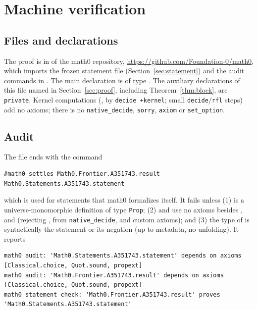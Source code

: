 \documentclass[11pt]{amsart}
\theoremstyle{plain}
\theoremstyle{definition}
\begin{document}
\section{Machine verification}\label{sec:lean}

\subsection*{Files and declarations}
The proof is in  of the math0 repository, \url{https://github.com/Foundation-0/math0}, which imports the frozen statement file (Section~\ref{sec:statement}) and the audit commands in . The main declaration is  of type . The auxiliary declarations of this file named in Section~\ref{sec:proof}, including Theorem~\ref{thm:block}, are \texttt{private}. Kernel computations (,  by \texttt{decide +kernel}; small \texttt{decide}/\texttt{rfl} steps) add no axioms; there is no \texttt{native\_decide}, \texttt{sorry}, \texttt{axiom} or \texttt{set\_option}.

\subsection*{Audit}
The file ends with the command
\begin{lstlisting}
#math0_settles Math0.Frontier.A351743.result Math0.Statements.A351743.statement
\end{lstlisting}
which is used for statements that math0 formalizes itself. It fails unless (1)  is a universe-monomorphic definition of type \texttt{Prop}; (2)  and  use no axioms besides ,  and  (rejecting ,  from \texttt{native\_decide}, and custom axioms); and (3) the type of  is syntactically the statement or its negation (up to metadata, no unfolding). It reports
\begin{lstlisting}[basicstyle=\ttfamily\scriptsize]
math0 audit: 'Math0.Statements.A351743.statement' depends on axioms [Classical.choice, Quot.sound, propext]
math0 audit: 'Math0.Frontier.A351743.result' depends on axioms [Classical.choice, Quot.sound, propext]
math0 statement check: 'Math0.Frontier.A351743.result' proves 'Math0.Statements.A351743.statement'
\end{lstlisting}
\end{document}
